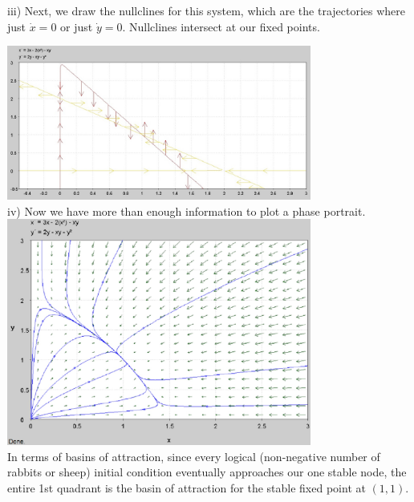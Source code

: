 \documentclass[11pt,answers]{exam}
\begin{document}
\begin{questions}
\begin{solution}
iii) Next, we draw the nullclines for this system, which are the trajectories where just $\dot{x} = 0$ or just $\dot{y} = 0$. Nullclines intersect at our fixed points.   

\includegraphics[width = 0.75\textwidth]{nullclines160425_a} \\

iv) Now we have more than enough information to plot a phase portrait. \\
\includegraphics[width = 0.75\textwidth]{phaseportrait}\\
In terms of basins of attraction, since every logical (non-negative number of rabbits or sheep) initial condition eventually approaches our one stable node, the entire 1st quadrant is the basin of attraction for the stable fixed point at $(1,1)$. 
\end{solution}


\end{questions}
\end{document}
